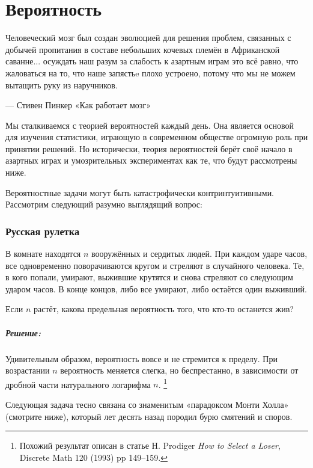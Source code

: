 ﻿%
\chapter*{Вероятность}

\epigraph{Человеческий мозг был создан эволюцией для решения проблем, связанных с добычей пропитания в составе небольших кочевых племён в Африканской саванне...
осуждать наш разум за слабость к азартным играм это всё равно, что жаловаться на то, что наше запястьe плохо устроено, потому что мы не можем вытащить руку из наручников.}{--- Стивен Пинкер «Как работает мозг»%
}

Мы сталкиваемся с теорией вероятностей каждый день.
Она является основой для изучения статистики, играющую в современном обществе огромную роль при принятии решений.
Но исторически, теория вероятностей берёт своё начало в азартных играх и умозрительных экспериментах как те, что будут рассмотрены ниже.

\medskip

Вероятностные задачи могут быть катастрофически контринтуитивными.
Рассмотрим следующий разумно выглядящий вопрос:

\subsection*{Русская рулетка} %

В комнате находятся $n$ вооружённых и сердитых людей.
При каждом ударе часов, все одновременно поворачиваются кругом и стреляют в случайного человека.
Те, в кого попали, умирают, выжившие крутятся и снова стреляют со следующим ударом часов.
В конце концов, либо все умирают, либо остаётся один выживший.

Если $n$ растёт, какова предельная вероятность того, что кто-то останется жив?

\paragraph{Решение:} Удивительным образом, вероятность вовсе и не стремится к пределу.
При возрастании $n$ вероятность меняется слегка, но беспрестанно, в зависимости от дробной части натурального логарифма $n$.%
\footnote{Похожий результат описан в статье H. Prodiger \emph{How to Select a Loser}, Discrete Math 120 (1993) pp 149--159.}

\medskip

Следующая задача тесно связана со знаменитым «парадоксом Монти Холла» (смотрите ниже), который лет десять назад породил бурю смятений и споров.

